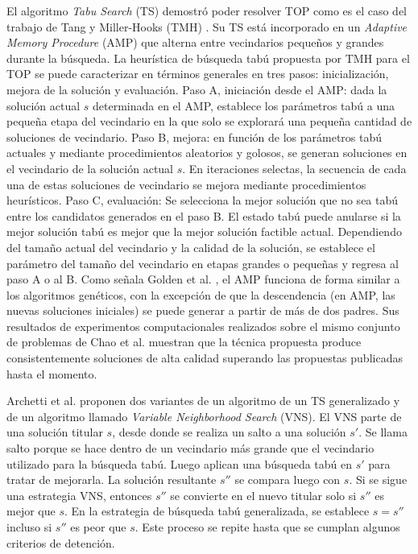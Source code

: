 \bigskip

El algoritmo \textit{Tabu Search} (TS) demostró poder resolver TOP como es el caso del trabajo de Tang y Miller-Hooks (TMH) \cite{TangMillerHooks}. Su TS está incorporado en un \textit{Adaptive Memory Procedure} (AMP) que alterna entre vecindarios pequeños y grandes durante la búsqueda. La heurística de búsqueda tabú propuesta por TMH para el TOP se puede caracterizar en términos generales en tres pasos: inicialización, mejora de la solución y evaluación. Paso A, iniciación desde el AMP: dada la solución actual $s$ determinada en el AMP, establece los parámetros tabú a una pequeña etapa del vecindario en la que solo se explorará una pequeña cantidad de soluciones de vecindario. Paso B, mejora: en función de los parámetros tabú actuales y mediante procedimientos aleatorios y golosos, se generan soluciones en el vecindario de la solución actual $s$. En iteraciones selectas, la secuencia de cada una de estas soluciones de vecindario se mejora mediante procedimientos heurísticos. Paso C, evaluación: Se selecciona la mejor solución que no sea tabú entre los candidatos generados en el paso B. El estado tabú puede anularse si la mejor solución tabú es mejor que la mejor solución factible actual. Dependiendo del tamaño actual del vecindario y la calidad de la solución, se establece el parámetro del tamaño del vecindario en etapas grandes o pequeñas y regresa al paso A o al B. Como señala Golden et al. \cite{GoldenLaporteTaillard}, el AMP funciona de forma similar a los algoritmos genéticos, con la excepción de que la descendencia (en AMP, las nuevas soluciones iniciales) se puede generar a partir de más de dos padres. Sus resultados de experimentos computacionales realizados sobre el mismo conjunto de problemas de Chao et al. muestran que la técnica propuesta produce consistentemente soluciones de alta calidad superando las propuestas publicadas hasta el momento.

\bigskip

Archetti et al. \cite{ArchettiHertzSperanza} proponen dos variantes de un algoritmo de un TS generalizado y de un algoritmo llamado \textit{Variable Neighborhood Search} (VNS). El VNS parte de una solución titular $s$, desde donde se realiza un salto a una solución $s'$. Se llama salto porque se hace dentro de un vecindario más grande que el vecindario utilizado para la búsqueda tabú. Luego aplican una búsqueda tabú en $s'$ para tratar de mejorarla. La solución resultante $s''$ se compara luego con $s$. Si se sigue una estrategia VNS, entonces $s''$ se convierte en el nuevo titular solo si $s''$ es mejor que $s$. En la estrategia de búsqueda tabú generalizada, se establece $s = s''$ incluso si $s''$ es peor que $s$. Este proceso se repite hasta que se cumplan algunos criterios de detención.

